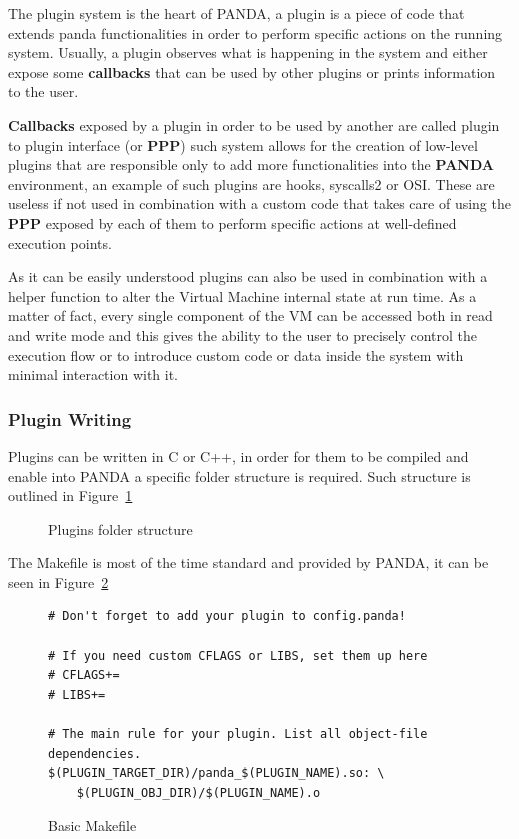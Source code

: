 The plugin system is the heart of PANDA, a plugin is a piece of code that extends panda functionalities in order to perform specific actions on the running system. Usually, a plugin observes what is happening in the system and either expose some \textbf{callbacks} that can be used by other plugins or prints information to the user.

\textbf{Callbacks} exposed by a plugin in order to be used by another are called plugin to plugin interface (or \textbf{PPP}) such system allows for the creation of low-level plugins that are responsible only to add more functionalities into the \textbf{PANDA} environment, an example of such plugins are hooks, syscalls2 or OSI. These are useless if not used in combination with a custom code that takes care of using the \textbf{PPP} exposed by each of them to perform specific actions at well-defined execution points.

As it can be easily understood plugins can also be used in combination with a helper function to alter the Virtual Machine internal state at run time. As a matter of fact, every single component of the VM can be accessed both in read and write mode and this gives the ability to the user to precisely control the execution flow or to introduce custom code or data inside the system with minimal interaction with it. 


\subsubsection{Plugin Writing}

Plugins can be written in C or C++, in order for them to be compiled and enable into PANDA a specific folder structure is required. Such structure is outlined in Figure~\ref{fig:plugs}

\begin{figure}[htp]
\centering
\begin{minipage}{\linewidth}
\end{minipage}
\caption{Plugins folder structure}
\label{fig:plugs}
\end{figure}

The Makefile is most of the time standard and provided by PANDA, it can be seen in Figure~\ref{fig:mak}

\begin{figure}[htp]
\centering
\begin{minipage}{\linewidth}
\begin{lstlisting}
# Don't forget to add your plugin to config.panda!

# If you need custom CFLAGS or LIBS, set them up here
# CFLAGS+=
# LIBS+=

# The main rule for your plugin. List all object-file dependencies.
$(PLUGIN_TARGET_DIR)/panda_$(PLUGIN_NAME).so: \
	$(PLUGIN_OBJ_DIR)/$(PLUGIN_NAME).o
\end{lstlisting}
\end{minipage}
\caption{Basic Makefile}
\label{fig:mak}
\end{figure}

